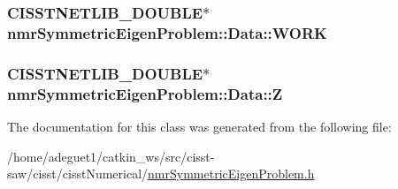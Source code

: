 \hypertarget{classnmr_symmetric_eigen_problem_1_1_data_ab0f6be9610721bccfc57ecb8a81d626d}{
\subsubsection[{W\-O\-R\-K}]{\setlength{\rightskip}{0pt plus 5cm}C\-I\-S\-S\-T\-N\-E\-T\-L\-I\-B\-\_\-\-D\-O\-U\-B\-L\-E$\ast$ nmr\-Symmetric\-Eigen\-Problem\-::\-Data\-::\-W\-O\-R\-K}}\label{classnmr_symmetric_eigen_problem_1_1_data_ab0f6be9610721bccfc57ecb8a81d626d}
\hypertarget{classnmr_symmetric_eigen_problem_1_1_data_a26f2388aec0bf6c027e7bcdd211212a2}{
\subsubsection[{Z}]{\setlength{\rightskip}{0pt plus 5cm}C\-I\-S\-S\-T\-N\-E\-T\-L\-I\-B\-\_\-\-D\-O\-U\-B\-L\-E$\ast$ nmr\-Symmetric\-Eigen\-Problem\-::\-Data\-::\-Z}}\label{classnmr_symmetric_eigen_problem_1_1_data_a26f2388aec0bf6c027e7bcdd211212a2}


The documentation for this class was generated from the following file\-:\begin{DoxyCompactItemize}
\item 
/home/adeguet1/catkin\-\_\-ws/src/cisst-\/saw/cisst/cisst\-Numerical/\hyperlink{nmr_symmetric_eigen_problem_8h}{nmr\-Symmetric\-Eigen\-Problem.\-h}\end{DoxyCompactItemize}
